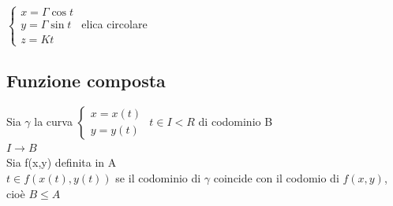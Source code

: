 \begin{esempio}
  $\begin{cases} x = \Gamma \cos t \\ y = \Gamma \sin t \\ z=Kt \end{cases}$ elica circolare 
\end{esempio}
\subsection{Funzione composta}
\begin{defi}
  Sia $\gamma$ la curva $\begin{cases} x=x(t) \\ y=y(t)\end{cases}$ $t\in I < R$
	di codominio B\\
  $I\to B$\\
  Sia f(x,y) definita in A \\
  $t\in f(x(t),y(t))$ se il codominio di $\gamma$ coincide con il codomio di
	$f(x,y)$, cioè
  $B \leq A$
\end{defi}
